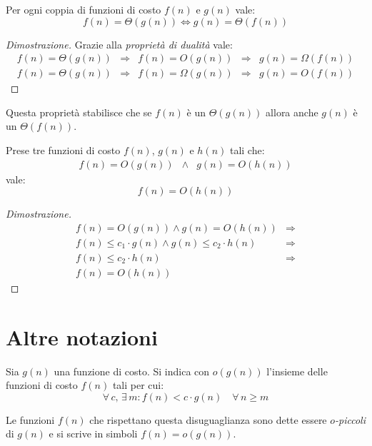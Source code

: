 \begin{definition}
    Per ogni coppia di funzioni di costo $f(n)$ e $g(n)$ vale:
    \[f(n)=\Theta(g(n))\Leftrightarrow g(n)=\Theta(f(n))\]
\end{definition}
\begin{proof}[Dimostrazione]
    Grazie alla \emph{proprietà di dualità} vale:
    \[\begin{array}{rcccl}
        f(n)=\Theta(g(n)) & \Rightarrow & f(n)=O(g(n)) & \Rightarrow & g(n)=\Omega(f(n))\\
        f(n)=\Theta(g(n)) & \Rightarrow & f(n)=\Omega(g(n)) & \Rightarrow & g(n)=O(f(n))
    \end{array}\]
\end{proof}\noindent
Questa proprietà stabilisce che se $f(n)$ è un $\Theta(g(n))$ allora anche $g(n)$
è un $\Theta(f(n))$.

\begin{definition}
    Prese tre funzioni di costo $f(n)$, $g(n)$ e $h(n)$ tali che:
    \[\begin{array}{lcr}
        f(n)=O(g(n)) & \wedge & g(n)=O(h(n))
    \end{array}\]
    vale:
    \[f(n)=O(h(n))\]
\end{definition}
\begin{proof}[Dimostrazione]
    \[\begin{array}{rc}
        f(n)=O(g(n))\wedge g(n)=O(h(n)) & \Rightarrow\\
        f(n)\leq c_1\cdot g(n)\wedge g(n)\leq c_2\cdot h(n) & \Rightarrow\\
        f(n)\leq c_2\cdot h(n) & \Rightarrow\\
        f(n)=O(h(n))
    \end{array}\]
\end{proof}

\section{Altre notazioni}
\begin{definition}[Notazione $o$]
    Sia $g(n)$ una funzione di costo. Si indica con $o(g(n))$ l'insieme delle
    funzioni di costo $f(n)$ tali per cui:
    \[\forall\,c,\,\exists\,m:f(n)<c\cdot g(n)\quad\forall\,n\geq m\]
\end{definition}\noindent
Le funzioni $f(n)$ che rispettano questa disuguaglianza sono dette essere
\emph{$o$-piccoli} di $g(n)$ e si scrive in simboli $f(n)=o(g(n))$.

